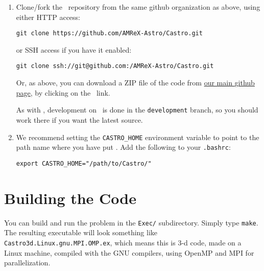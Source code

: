 \begin{enumerate}
\item Clone/fork the \castro\ repository from the same {\sf
  github} organization as above, using either HTTP access:
\begin{verbatim}
git clone https://github.com/AMReX-Astro/Castro.git
\end{verbatim}
or SSH access if you have it enabled:
\begin{verbatim}
git clone ssh://git@github.com:/AMReX-Astro/Castro.git
\end{verbatim}
Or, as above, you can download a ZIP file of the code from
\href{https://github.com/AMReX-Astro}{our main {\sf github} page},
by clicking on the \castro\ link.

As with \amrex, development on \castro\ is done in the
{\tt development} branch, so you should work there if you want
the latest source.

\item We recommend setting the {\tt CASTRO\_HOME} environment
  variable to point to the path name where you have put \castro.
  Add the following to your {\tt .bashrc}:
\begin{verbatim}
export CASTRO_HOME="/path/to/Castro/"
\end{verbatim}

\end{enumerate}


\section{Building the Code}

You can build and run the problem in the {\tt Exec/} subdirectory.
Simply type {\tt make}. The resulting executable will look something like {\tt
  Castro3d.Linux.gnu.MPI.OMP.ex}, which means this is 3-d code,
  made on a Linux machine, compiled with the GNU compilers,
  using OpenMP and MPI for parallelization.

